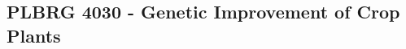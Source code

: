 \documentclass[10pt]{article}
\begin{document}





\subsection*{PLBRG 4030 - Genetic Improvement of Crop Plants}
\end{document}
